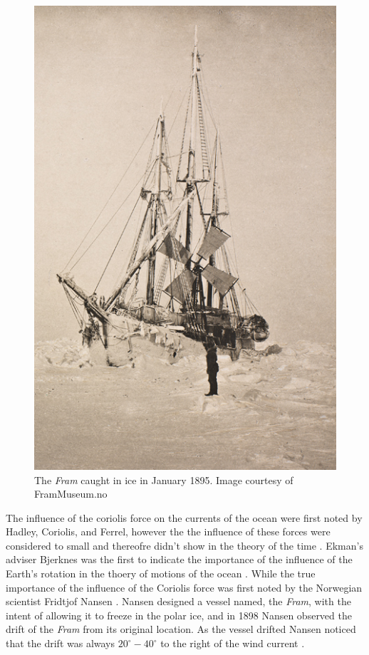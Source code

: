 \begin{figure}
  \includegraphics[scale=0.35]{Figures/Fram.jpg}
  \caption{The \emph{Fram} caught in ice in January 1895. Image courtesy of
  FramMuseum.no}
  \label{fig:Fram}
\end{figure}
The influence of the coriolis force on the currents of the ocean were first
noted by Hadley, Coriolis, and Ferrel, however the the influence of these forces
were considered to small and thereofre didn't show in the theory of the time
\cite{Ekman1905}. Ekman's adviser Bjerknes was the first to indicate the
importance of the influence of the Earth's rotation in the thoery of motions of
the ocean \cite{Ekman1905}. While the true importance of the influence of the
Coriolis force was first noted by the Norwegian scientist Fridtjof Nansen
\cite{Beesley2008, Ekman1905}. Nansen designed a vessel named, the \emph{Fram},
with the intent of allowing it to freeze in the polar ice, and in 1898 Nansen
observed the drift of the \emph{Fram} from its original location. As the vessel
drifted Nansen noticed that the drift was always $20^\circ - 40^\circ$ to the
right of the wind current \cite{Beesley2008}.

